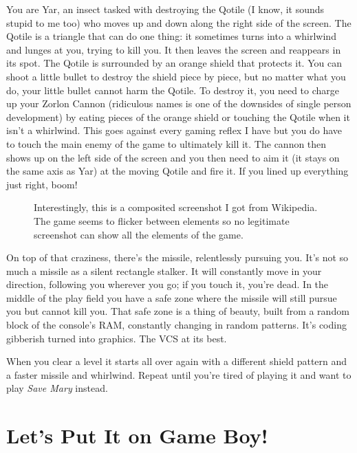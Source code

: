 \documentclass{book}
\begin{document}
You are Yar, an insect tasked with destroying the Qotile (I know, it sounds stupid to me too) who moves up and down along the right side of the screen. The Qotile is a triangle that can do one thing: it sometimes turns into a whirlwind and lunges at you, trying to kill you. It then leaves the screen and reappears in its spot. The Qotile is surrounded by an orange shield that protects it. You can shoot a little bullet to destroy the shield piece by piece, but no matter what you do, your little bullet cannot harm the Qotile. To destroy it, you need to charge up your Zorlon Cannon (ridiculous names is one of the downsides of single person development) by eating pieces of the orange shield or touching the Qotile when it isn’t a whirlwind. This goes against every gaming reflex I have but you do have to touch the main enemy of the game to ultimately kill it. The cannon then shows up on the left side of the screen and you then need to aim it (it stays on the same axis as Yar) at the moving Qotile and fire it. If you lined up everything just right, boom!\par
\FloatBarrier\vspace{\baselineskip}\begin{figure}[H]\caption*{Interestingly, this is a composited screenshot I got from Wikipedia. The game seems to flicker between elements so no legitimate screenshot can show all the elements of the game.}\end{figure}
On top of that craziness, there’s the missile, relentlessly pursuing you. It’s not so much a missile as a silent rectangle stalker. It will constantly move in your direction, following you wherever you go; if you touch it, you’re dead. In the middle of the play field you have a safe zone where the missile will still pursue you but cannot kill you. That safe zone is a thing of beauty, built from a random block of the console’s RAM, constantly changing in random patterns. It’s coding gibberish turned into graphics. The VCS at its best.\par
When you clear a level it starts all over again with a different shield pattern and a faster missile and whirlwind. Repeat until you’re tired of playing it and want to play \emph{Save Mary} instead.\par
\FloatBarrier\section*{Let’s Put It on Game Boy!}
\end{document}
